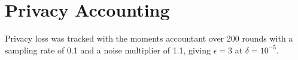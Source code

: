 \chapter{Privacy Accounting}
\label{app:a}

Privacy loss was tracked with the moments accountant over 200 rounds with a sampling rate of
0.1 and a noise multiplier of 1.1, giving $\epsilon = 3$ at $\delta = 10^{-5}$.
